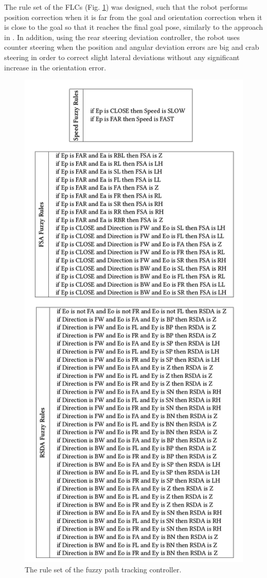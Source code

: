 \documentclass[conference]{IEEEtran}
\begin{document}
The rule set of the FLCs (Fig. \ref{fig:fuzzy_rules}) was designed, such that the robot performs position correction when it is far from the goal and orientation correction when it is close to the goal so that it reaches the final goal pose, similarly to the approach in \cite{flc_thesis}. In addition, using the rear steering deviation controller, the robot uses counter steering when the position and angular deviation errors are big and crab steering in order to correct slight lateral deviations without any significant increase in the orientation error.

\begin{figure}[!ht]
	\centering
	\includegraphics[width=0.75\linewidth]{Figures/fuzzy_rules2.png}%
	\caption{The rule set of the fuzzy path tracking controller.}
	\label{fig:fuzzy_rules}
\end{figure}
\end{document}
